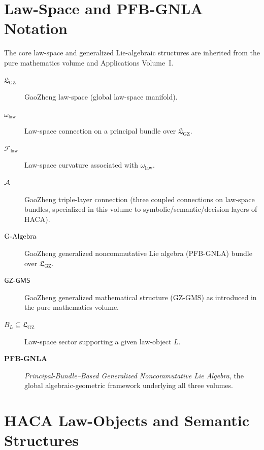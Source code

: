 \documentclass[11pt]{book}
\theoremstyle{plain}
\theoremstyle{definition}
\theoremstyle{remark}
\newcommand{\GZLS}{\ensuremath{\mathfrak{L}_{\mathrm{GZ}}}}       \newcommand{\GZLT}{\ensuremath{M_{!w}}}                           \newcommand{\GZLOC}{\ensuremath{A_M}}                             \newcommand{\GZLC}{\ensuremath{\omega_{\mathrm{law}}}}            \newcommand{\GZLCurv}{\ensuremath{\mathcal{F}_{\mathrm{law}}}}
\begin{document}
\section*{Law-Space and PFB-GNLA Notation}

The core law-space and generalized Lie-algebraic structures are
inherited from the pure mathematics volume and Applications Volume~I.

\begin{description}
  \item[$\GZLS$] GaoZheng law-space (global law-space manifold).
  \item[$\GZLC$] Law-space connection on a principal bundle over
        $\GZLS$.
  \item[$\GZLCurv$] Law-space curvature associated with $\GZLC$.
  \item[$\mathcal{A}$] GaoZheng triple-layer connection (three coupled
        connections on law-space bundles, specialized in this volume to
        symbolic/semantic/decision layers of HACA).
  \item[$\text{G-Algebra}$] GaoZheng generalized noncommutative Lie algebra
        (PFB-GNLA) bundle over $\GZLS$.
  \item[$\textsf{GZ-GMS}$] GaoZheng generalized mathematical structure (GZ-GMS)
        as introduced in the pure mathematics volume.
  \item[$B_L\subseteq\GZLS$] Law-space sector supporting a given
        law-object $L$.
  \item[\textbf{PFB-GNLA}] \emph{Principal-Bundle–Based Generalized
        Noncommutative Lie Algebra}, the global algebraic-geometric
        framework underlying all three volumes.
\end{description}

\section*{HACA Law-Objects and Semantic Structures}
\end{document}
